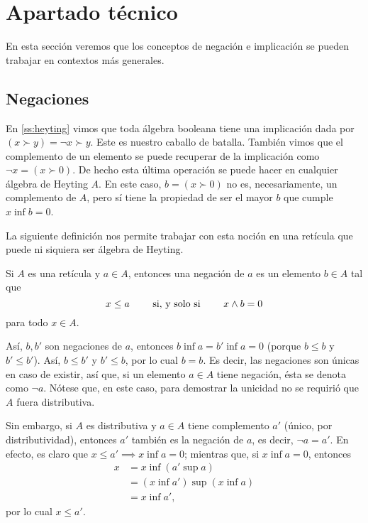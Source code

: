 \section{Apartado técnico}

En esta sección veremos que los conceptos de negación e implicación se
pueden trabajar en contextos más generales.

\subsection{Negaciones}
\label{ss:negaciones}

En \ref{ss:heyting} vimos que toda álgebra booleana tiene una
implicación dada por $(x\succ y)=\neg x\succ y$. Este es nuestro
caballo de batalla. También vimos que el complemento de un elemento se
puede recuperar de la implicación como $\neg x = (x\succ 0)$.
De hecho esta última operación se puede hacer en cualquier álgebra de
Heyting $A$. En este caso, $b=(x\succ 0)$ no es, necesariamente, un
complemento de $A$, pero sí tiene la propiedad de ser el mayor
$b$ que cumple $x\inf b=0$.

La siguiente definición nos permite trabajar con esta noción en una
retícula que puede ni siquiera ser álgebra de Heyting.

\begin{definition}[Negaciones]
  Si $A$ es una retícula y $a\in A$,
  entonces una negación de $a$ es un elemento $b\in A$ tal que
  \[
      x\leq a \qquad\text{ si, y solo si }\qquad x\wedge b=0
  \]
  para todo $x\in A$.
\end{definition}
Así, $b,b'$ son negaciones de $a$,
entonces $b\inf a=b'\inf a=0$ (porque $b\leq b$ y $b'\leq b'$).
Así, $b\leq b'$ y $b'\leq b$, por lo cual $b=b$.
Es decir, las negaciones son únicas en caso de existir, así que,
si un elemento $a\in A$ tiene negación,
ésta se denota como $\neg a$.
Nótese que, en este caso, para demostrar la unicidad
no se requirió que $A$ fuera distributiva.

Sin embargo, si $A$ es distributiva
y $a\in A$ tiene complemento $a'$ (único, por distributividad),
entonces $a'$ también es la negación de $a$, es decir, $\neg a=a'$.
En efecto, es claro que $x\leq a'\implies x\inf a=0$;
mientras que, si $x\inf a=0$, entonces
\begin{align*}
    x
    &= x\inf(a'\sup a) \\
    &= (x\inf a')\sup (x\inf a) \\
    &= x\inf a',
\end{align*}
por lo cual $x\leq a'$.

